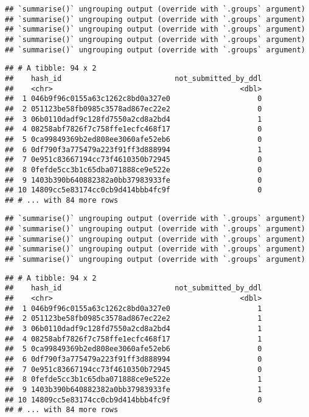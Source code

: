 \documentclass[
]{article}
\begin{document}
\begin{verbatim}
## `summarise()` ungrouping output (override with `.groups` argument)
## `summarise()` ungrouping output (override with `.groups` argument)
## `summarise()` ungrouping output (override with `.groups` argument)
## `summarise()` ungrouping output (override with `.groups` argument)
## `summarise()` ungrouping output (override with `.groups` argument)
\end{verbatim}

\begin{verbatim}
## # A tibble: 94 x 2
##    hash_id                          not_submitted_by_ddl
##    <chr>                                           <dbl>
##  1 046b9f96c0155a63c1262c8bd0a327e0                    0
##  2 051123be58fb0985c3578ad867ec22e2                    0
##  3 06b0110dadf9c128fd7550a2cd8a2bd4                    1
##  4 08258abf7826f7c758ffe1ecfc468f17                    0
##  5 0ca99849369b2ed808ee3060afe52eb6                    0
##  6 0df790f3a775479a223f91ff3d888994                    1
##  7 0e951c83667194cc73f4610350b72945                    0
##  8 0fefde5cc3b1c65dba071888ce9e522e                    0
##  9 1403b390b640882382a0bb37983933fe                    0
## 10 14809cc5e83174cc0cb9d414bbb4fc9f                    0
## # ... with 84 more rows
\end{verbatim}

\begin{verbatim}
## `summarise()` ungrouping output (override with `.groups` argument)
## `summarise()` ungrouping output (override with `.groups` argument)
## `summarise()` ungrouping output (override with `.groups` argument)
## `summarise()` ungrouping output (override with `.groups` argument)
## `summarise()` ungrouping output (override with `.groups` argument)
\end{verbatim}

\begin{verbatim}
## # A tibble: 94 x 2
##    hash_id                          not_submitted_by_ddl
##    <chr>                                           <dbl>
##  1 046b9f96c0155a63c1262c8bd0a327e0                    1
##  2 051123be58fb0985c3578ad867ec22e2                    1
##  3 06b0110dadf9c128fd7550a2cd8a2bd4                    1
##  4 08258abf7826f7c758ffe1ecfc468f17                    1
##  5 0ca99849369b2ed808ee3060afe52eb6                    0
##  6 0df790f3a775479a223f91ff3d888994                    0
##  7 0e951c83667194cc73f4610350b72945                    0
##  8 0fefde5cc3b1c65dba071888ce9e522e                    1
##  9 1403b390b640882382a0bb37983933fe                    1
## 10 14809cc5e83174cc0cb9d414bbb4fc9f                    0
## # ... with 84 more rows
\end{verbatim}
\end{document}
